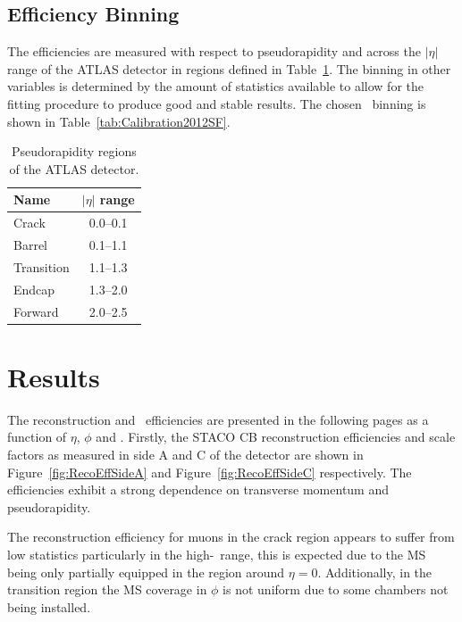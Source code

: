 \subsection{Efficiency Binning}
The efficiencies are measured with respect to pseudorapidity and across the $|\eta|$ range of the ATLAS detector in regions defined in Table~\ref{tab:CalibrationEtaRegions}. The binning in other variables is determined by the amount of statistics available to allow for the fitting procedure to produce good and stable results. The chosen \pt\ binning is shown in Table~\ref{tab:Calibration2012SF}.

\begin{table}[thbp]
  \centering
  \begin{tabular}{@{}lc@{}}
    \toprule
    Name       & $|\eta|$ range \\
    \midrule
    Crack      & \numrange{0.0}{0.1} \\
    Barrel     & \numrange{0.1}{1.1} \\
    Transition & \numrange{1.1}{1.3} \\
    Endcap     & \numrange{1.3}{2.0} \\
    Forward    & \numrange{2.0}{2.5} \\
    \bottomrule
  \end{tabular}
  \caption{Pseudorapidity regions of the ATLAS detector.} \label{tab:CalibrationEtaRegions}
\end{table}

\section{Results}

The reconstruction and \xsm\ efficiencies are presented in the following pages as a function of $\eta$, $\phi$ and \pt. Firstly, the STACO CB reconstruction efficiencies and scale factors as measured in side A and C of the detector are shown in Figure~\ref{fig:RecoEffSideA} and Figure~\ref{fig:RecoEffSideC} respectively. The efficiencies exhibit a strong dependence on transverse momentum and pseudorapidity.

The reconstruction efficiency for muons in the crack region appears to suffer from low statistics particularly in the high-\pt\ range, this is expected due to the MS being only partially equipped in the region around $\eta=0$. Additionally, in the transition region the MS coverage in $\phi$ is not uniform due to some chambers not being installed.

